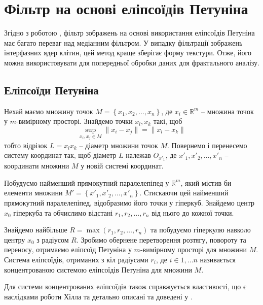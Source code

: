 
\section{Фільтр на основі еліпсоїдів Петуніна}

Згідно з роботою \parencite{bib:petuninfilter}, фільтр зображень на основі використання еліпсоїдів Петуніна має багато переваг над медіанним фільтром. У випадку фільтрації зображень інтерфазних ядер клітин, цей метод краще зберігає форму текстури. Отже, його можна використовувати для попередньої обробки даних для фрактального аналізу.

\subsection{Еліпсоїди Петуніна}

Нехай маємо множину точок \(M = \left\{x_1, x_2, \dots, x_n\right\}\), де \(x_i \in \mathbb{R}^m\) -- множина точок у \(m\)-вимірному просторі. Знайдемо точки \(x_l, x_k\) такі, щоб
\begin{equation*}
\sup_{x_i, x_j \in M}{\|x_i - x_j\|} = \|x_l - x_k\|
\end{equation*}
тобто відрізок \(L = x_l x_k\) -- діаметр множини точок \(M\). Повернемо і перенесемо систему координат так, щоб діаметр \(L\) належав \(O_{x'_1}\), де \(x'_1, x'_2, \dots, x'_n\) -- координати множини \(M\) у новій системі координат. 

Побудуємо найменший прямокутний паралелепіпед у \(\mathbb{R}^m\), який містив би елементи множини \(M' = \left\{x'_1, x'_2, \dots, x'_n\right\}\). Стискаючи цей найменший прямокутний паралелепіпед, відобразимо його точки у гіперкуб. Знайдемо центр \(x_0\) гіперкуба та обчислимо відстані \(r_1, r_2, \dots, r_n\) від нього до кожної точки. 

Знайдемо найбільше \(R = \max{(r_1, r_2, \dots, r_n)}\) та побудуємо гіперкулю навколо центру \(x_0\) з радіусом \(R\). Зробимо обернене перетворення розтягу, повороту та переносу, отримаємо еліпсоїд Петуніна у \(m\)-вимірному просторі для множини \(M\). Система еліпсоїдів, отриманих з кіл радіусами \(r_i\), де \(i \in 1, \dots n\) називається концентрованою системою еліпсоїдів Петуніна для множини \(M\).

Для системи концентрованих еліпсоїдів також справжується властивості, що є наслідками роботи Хілла \citep{bib:hill} та детально описані та доведені у \citep{bib:lyashko}.

